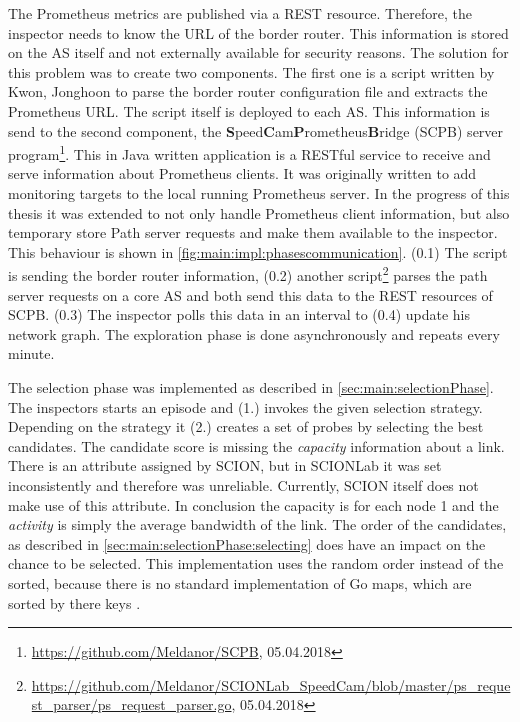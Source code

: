 \documentclass[thesis.tex]{subfiles}
\begin{document}
The Prometheus metrics are published via a REST resource. Therefore, the inspector needs to know the URL of the border router. This information is stored on the AS itself and not externally available for security reasons. The solution for this problem was to create two components. The first one is a script written by Kwon, Jonghoon to parse the border router configuration file and extracts the Prometheus URL. The script itself is deployed to each AS. This information is send to the second component, the \textbf{S}peed\textbf{C}am\textbf{P}rometheus\textbf{B}ridge (SCPB) server program\footnote{\url{https://github.com/Meldanor/SCPB}, 05.04.2018}. This in Java written application is a RESTful service to receive and serve information about Prometheus clients. It was originally written to add monitoring targets to the local running Prometheus server. In the progress of this thesis it was extended to not only handle Prometheus client information, but also temporary store Path server requests and make them available to the inspector. This behaviour is shown in \autoref{fig:main:impl:phasescommunication}.
(0.1) The script is sending the border router information, (0.2) another script\footnote{\url{https://github.com/Meldanor/SCIONLab_SpeedCam/blob/master/ps_request_parser/ps_request_parser.go}, 05.04.2018} parses the path server requests on a core AS and both send this data to the REST resources of SCPB. (0.3) The inspector polls this data in an interval to (0.4) update his network graph. The exploration phase is done asynchronously and repeats every minute.

The selection phase was implemented as described in \autoref{sec:main:selectionPhase}. The inspectors starts an episode and (1.) invokes the given selection strategy. Depending on the strategy it (2.) creates a set of probes by selecting the best candidates. The candidate score is missing the \textit{capacity} information about a link. There is an attribute assigned by SCION, but in SCIONLab it was set inconsistently and therefore was unreliable. Currently, SCION itself does not make use of this attribute. In conclusion the capacity is for each node 1 and the \textit{activity} is simply the average bandwidth of the link.
The order of the candidates, as described in \autoref{sec:main:selectionPhase:selecting} does have an impact on the chance to be selected. This implementation uses the random order instead of the sorted, because there is no standard implementation of Go maps, which are sorted by there keys \cite{goMapsInAction.2013}.
\end{document}
